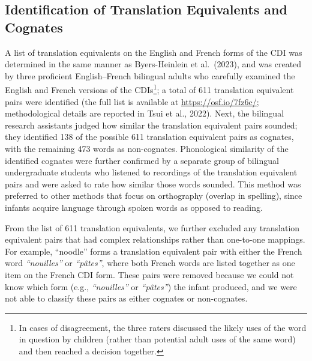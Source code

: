 \documentclass[
  ,man,floatsintext]{apa6}
\begin{document}
\hypertarget{identification-of-translation-equivalents-and-cognates}{%
\subsection{Identification of Translation Equivalents and Cognates}\label{identification-of-translation-equivalents-and-cognates}}

A list of translation equivalents on the English and French forms of the CDI was determined in the same manner as Byers-Heinlein et al.~(2023), and was created by three proficient English--French bilingual adults who carefully examined the English and French versions of the CDIs\footnote{In cases of disagreement, the three raters discussed the likely uses of the word in question by children (rather than potential adult uses of the same word) and then reached a decision together.}; a total of 611 translation equivalent pairs were identified (the full list is available at \url{https://osf.io/7fz6c/}; methodological details are reported in Tsui et al., 2022). Next, the bilingual research assistants judged how similar the translation equivalent pairs sounded; they identified 138 of the possible 611 translation equivalent pairs as cognates, with the remaining 473 words as non-cognates. Phonological similarity of the identified cognates were further confirmed by a separate group of bilingual undergraduate students who listened to recordings of the translation equivalent pairs and were asked to rate how similar those words sounded. This method was preferred to other methods that focus on orthography (overlap in spelling), since infants acquire language through spoken words as opposed to reading.

From the list of 611 translation equivalents, we further excluded any translation equivalent pairs that had complex relationships rather than one-to-one mappings. For example, ``noodle'' forms a translation equivalent pair with either the French word \emph{``nouilles''} or \emph{``pâtes''}, where both French words are listed together as one item on the French CDI form. These pairs were removed because we could not know which form (e.g., \emph{``nouilles''} or \emph{``pâtes''}) the infant produced, and we were not able to classify these pairs as either cognates or non-cognates.
\end{document}
